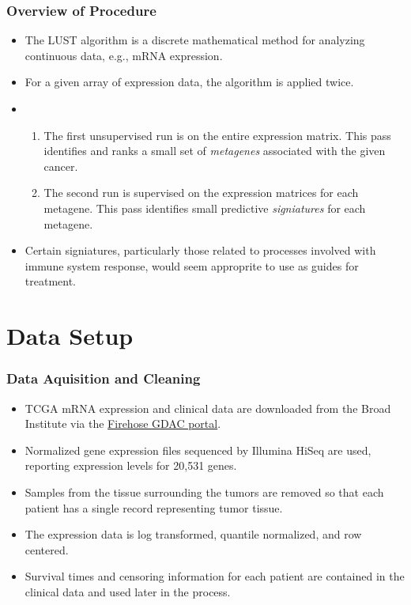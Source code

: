 \documentclass[
	11pt, %
]{beamer}
\begin{document}
\begin{frame}
	\frametitle{Overview of Procedure}
	
	\begin{itemize}
        \item The LUST algorithm is a discrete mathematical method for analyzing continuous data, e.g., mRNA expression.
        \pause
        \item For a given array of expression data, the algorithm is applied twice.
        \pause
        \item 
        \begin{enumerate}
            \item The first unsupervised run is on the entire expression matrix. This pass identifies and ranks a small set of \emph{metagenes} associated with the given cancer.
            \pause
            \item The second run is supervised on the expression matrices for each metagene. This pass identifies small predictive \emph{signiatures} for each metagene.
        \end{enumerate}
        \pause
        \item Certain signiatures, particularly those related to processes involved with immune system response, would seem approprite to use as guides for treatment.
    \end{itemize}
\end{frame}


\section{Data Setup}

\begin{frame}
	\frametitle{Data Aquisition and Cleaning}
	
	\begin{itemize}
        \item TCGA mRNA expression and clinical data are downloaded from the Broad Institute via the \href{https://gdac.broadinstitute.org/}{Firehose GDAC portal}.
        \pause
        \item Normalized gene expression files sequenced by Illumina HiSeq are used, reporting expression levels for 20,531 genes.
        \pause
        \item Samples from the tissue surrounding the tumors are removed so that each patient has a single record representing tumor tissue.
        \pause
        \item The expression data is log transformed, quantile normalized, and row centered.
        \pause
        \item Survival times and censoring information for each patient are contained in the clinical data and used later in the process.
    \end{itemize}
\end{frame}
\end{document}
